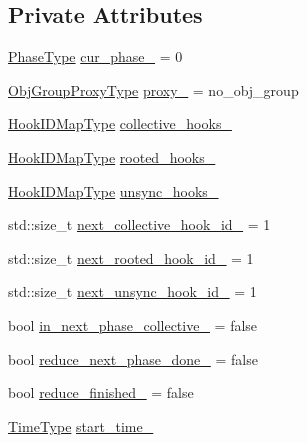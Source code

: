 \subsection*{Private Attributes}
\begin{DoxyCompactItemize}
\item 
\hyperlink{namespacevt_a46ce6733d5cdbd735d561b7b4029f6d7}{Phase\+Type} \hyperlink{structvt_1_1phase_1_1_phase_manager_a481f6b2da9da107b31d6ce8d970c7aff}{cur\+\_\+phase\+\_\+} = 0
\item 
\hyperlink{namespacevt_ad7cae989df485fccca57f0792a880a8e}{Obj\+Group\+Proxy\+Type} \hyperlink{structvt_1_1phase_1_1_phase_manager_a119ac185c79c50761d7e8c3f68b751e7}{proxy\+\_\+} = no\+\_\+obj\+\_\+group
\item 
\hyperlink{structvt_1_1phase_1_1_phase_manager_a7f9784fa7550beaa1e7d59e639169a8b}{Hook\+I\+D\+Map\+Type} \hyperlink{structvt_1_1phase_1_1_phase_manager_aafc873771fb849243f082cba71f36672}{collective\+\_\+hooks\+\_\+}
\item 
\hyperlink{structvt_1_1phase_1_1_phase_manager_a7f9784fa7550beaa1e7d59e639169a8b}{Hook\+I\+D\+Map\+Type} \hyperlink{structvt_1_1phase_1_1_phase_manager_a6a2b1be3c11f4fc91bfb84cc2c47c545}{rooted\+\_\+hooks\+\_\+}
\item 
\hyperlink{structvt_1_1phase_1_1_phase_manager_a7f9784fa7550beaa1e7d59e639169a8b}{Hook\+I\+D\+Map\+Type} \hyperlink{structvt_1_1phase_1_1_phase_manager_aab9b9b691a5e2cd7100c484dcf6f5e59}{unsync\+\_\+hooks\+\_\+}
\item 
std\+::size\+\_\+t \hyperlink{structvt_1_1phase_1_1_phase_manager_a4270d82b84c02d60c16521d4c5972657}{next\+\_\+collective\+\_\+hook\+\_\+id\+\_\+} = 1
\item 
std\+::size\+\_\+t \hyperlink{structvt_1_1phase_1_1_phase_manager_a22a3945b22c96b581a1aa1cdadd149e4}{next\+\_\+rooted\+\_\+hook\+\_\+id\+\_\+} = 1
\item 
std\+::size\+\_\+t \hyperlink{structvt_1_1phase_1_1_phase_manager_abb2e9aeb7dba41c6e33322ccfc04de3b}{next\+\_\+unsync\+\_\+hook\+\_\+id\+\_\+} = 1
\item 
bool \hyperlink{structvt_1_1phase_1_1_phase_manager_ac57c867b3d30923a0241ef462a275f5c}{in\+\_\+next\+\_\+phase\+\_\+collective\+\_\+} = false
\item 
bool \hyperlink{structvt_1_1phase_1_1_phase_manager_a28428326d10fe9485d3da07e8650d352}{reduce\+\_\+next\+\_\+phase\+\_\+done\+\_\+} = false
\item 
bool \hyperlink{structvt_1_1phase_1_1_phase_manager_a2d4f894445c848ea2ead4a4fe0919eb0}{reduce\+\_\+finished\+\_\+} = false
\item 
\hyperlink{namespacevt_a876a9d0cd5a952859c72de8a46881442}{Time\+Type} \hyperlink{structvt_1_1phase_1_1_phase_manager_a77b80e03b225c32acd50ed727fe4aafd}{start\+\_\+time\+\_\+}
\end{DoxyCompactItemize}
